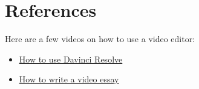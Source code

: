 \documentclass[12pt]{article}
\begin{document}
\section*{References}
Here are a few videos on how to use a video editor:
\begin{itemize}
    \item \href{https://www.youtube.com/watch?v=63Ln33O4p4c}{How to use Davinci Resolve}
    \item \href{https://www.youtube.com/watch?v=TfGP15IKseI}{How to write a video essay}
\end{itemize}
\end{document}
